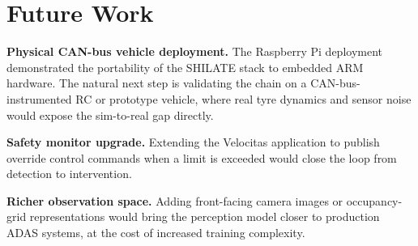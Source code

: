 \section{Future Work}
\label{sec:future}

\textbf{Physical CAN-bus vehicle deployment.} The Raspberry Pi
deployment demonstrated the portability of the SHILATE stack to embedded
ARM hardware. The natural next step is validating the chain on a
CAN-bus-instrumented RC or prototype vehicle, where real tyre dynamics
and sensor noise would expose the sim-to-real gap directly.

\textbf{Safety monitor upgrade.} Extending the Velocitas application to
publish override control commands when a limit is exceeded would close
the loop from detection to intervention.

\textbf{Richer observation space.} Adding front-facing camera images or
occupancy-grid representations would bring the perception model closer to
production ADAS systems, at the cost of increased training complexity.
